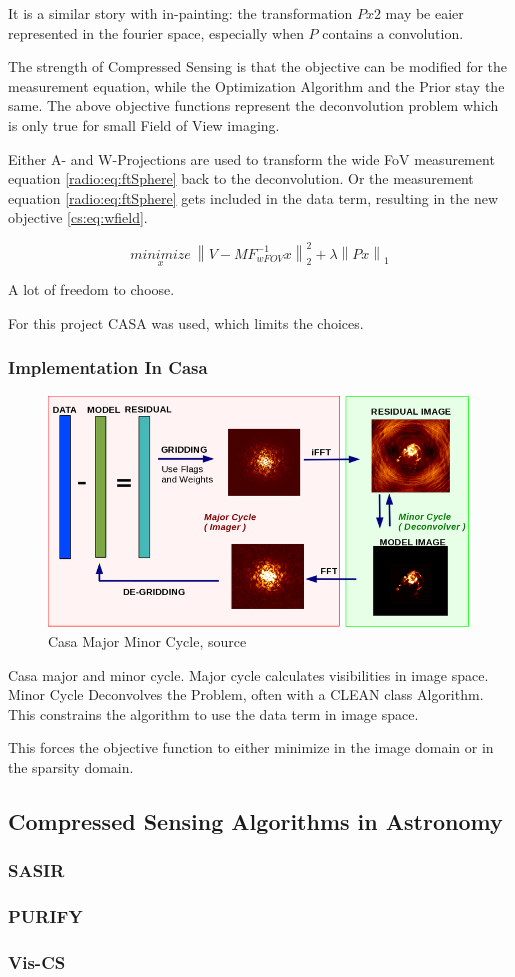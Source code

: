 It is a similar story with in-painting: the transformation $Px2$ may be eaier represented in the fourier space, especially when $P$ contains a convolution.

The strength of Compressed Sensing is that the objective can be modified for the measurement equation, while the Optimization Algorithm and the Prior stay the same. The above objective functions represent the deconvolution problem which is only true for small Field of View imaging. 

Either A- and W-Projections are used to transform the wide FoV measurement equation \eqref{radio:eq:ftSphere} back to the deconvolution. Or the measurement equation \eqref{radio:eq:ftSphere} gets included in the data term, resulting in the new objective \eqref{cs:eq:wfield}.

\begin{equation}\label{cs:eq:wfield}
	\underset{x}{minimize} \: \left \| V - MF_{wFOV}^{-1}x \right \|_2^2 + \lambda \left \| Px\right \|_1
\end{equation}

A lot of freedom to choose. 

For this project CASA was used, which limits the choices.


\subsubsection{Implementation In Casa}
\begin{figure}[h!]
	\centering
	\includegraphics[width=0.6\linewidth]{./chapters/04.cs/img/casa_major_minor.png}
	\caption{Casa Major Minor Cycle, source \cite{casa2018major}}
	\label{cs:major}
\end{figure}

Casa major and minor cycle. Major cycle calculates visibilities in image space. Minor Cycle Deconvolves the Problem, often with a CLEAN class Algorithm. This constrains the algorithm to use the data term in image space. 

This forces the objective function to either minimize in the image domain or in the sparsity domain.


\subsection{Compressed Sensing Algorithms in Astronomy}

\subsubsection{SASIR}

\subsubsection{PURIFY}

\subsubsection{Vis-CS}


 
